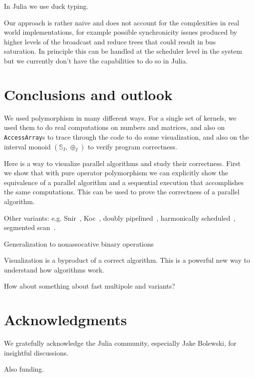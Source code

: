 \documentclass{sig-alternate}
\newcommand{\code}[1]{\texttt{#1}}
\newcommand{\TODO}[1]{\todo[inline]{#1}}
\begin{document}
In Julia we use duck typing.

Our approach is rather naive and does not account for the complexities in real world implementations, for example possible synchronicity issues produced by higher levels of the broadcast and reduce trees that could result in bus saturation. In principle this can be handled at the scheduler level in the system but we currently don't have the capabilities to do so in Julia.

\section{Conclusions and outlook}

\TODO{Cleanup}

We used polymorphism in many different ways. For a single set of kernels, we used them to do real computations on numbers and matrices, and also on \code{AccessArray}s to trace through the code to do some visualization, and also on the interval monoid $(\mathbb S_I, \oplus_I)$ to verify program correctness.

Here is a way to visualize parallel algorithms and study their correctness. First we show that with pure operator polymorphism we can explicitly show the equivalence of a parallel algorithm and a sequential execution that accomplishes the same computations. This can be used to prove the correctness of a parallel algorithm.

Other variants: e.g. Snir~\cite{Kruskal1985}, Koc~\cite{Egecioglu1992}, doubly pipelined~\cite{Sanders2006}, harmonically scheduled~\cite{Wang1996}, segmented scan~\cite{Sengupta2007}.

Generalization to nonassocative binary operations~\cite{Chen1992}

Visualization is a byproduct of a correct algorithm. This is a powerful new way to understand how algorithms work.

How about something about fast multipole and variants?

\section{Acknowledgments}
We gratefully acknowledge the Julia community, especially Jake Bolewski, for insightful discussions.

Also funding.




\appendix
\end{document}
